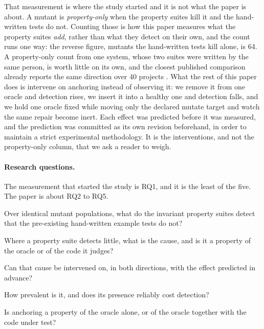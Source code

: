 \documentclass[12pt]{article}
\begin{document}
That measurement is where the study started and it is not what the paper is
about. A mutant is \emph{property-only} when the property suites kill it and the
hand-written tests do not. Counting those is how this paper measures what the
property suites \emph{add}, rather than what they detect on their own, and the
count runs one way: the reverse figure, mutants the hand-written tests kill
alone, is 64. A property-only count from one system, whose two suites were
written by the same person, is worth little on its own, and the closest published
comparison already reports the same direction over 40 projects
\cite{ravi2025}. What the rest of this paper does is intervene on anchoring instead of observing it: we remove it from one oracle and detection
rises, we insert it into a healthy one and detection falls, and we hold one oracle
fixed while moving only the declared mutate target and watch the same repair
become inert. Each effect was predicted before it was measured, and the prediction
was committed as its own revision beforehand, in order to maintain a strict
experimental methodology. It is the interventions, and not the property-only column,
that we ask a reader to weigh.

\paragraph{Research questions.} The measurement that started the study is RQ1,
and it is the least of the five. The paper is about RQ2 to RQ5.

\begin{description}\small
\setlength{\itemsep}{0pt}\setlength{\parsep}{0pt}\setlength{\topsep}{2pt}
\item[RQ1] Over identical mutant populations, what do the
      invariant property suites detect that the pre-existing hand-written example
      tests do not?
\item[RQ2] Where a property suite detects little, what is
      the cause, and is it a property of the oracle or of the code it judges?
\item[RQ3] Can that cause be intervened on, in both
      directions, with the effect predicted in advance?
\item[RQ4] How prevalent is it, and does its presence
      reliably cost detection?
\item[RQ5] Is anchoring a property of the oracle alone, or of
      the oracle together with the code under test?
\end{description}
\end{document}
